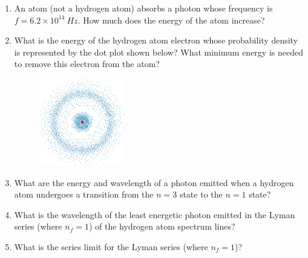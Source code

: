 \begin{enumerate}

\item An atom (not a hydrogen atom) absorbs a photon whose frequency is
$f = 6.2\times 10^{14}~Hz$.
How much does the energy of the atom increase?

\item What is the energy of the hydrogen atom  electron whose probability density
is represented by the dot plot shown below? 
What minimum energy is needed to remove this electron from the atom?
\begin{figure}[hbt]
\begin{center}
\includegraphics[height=1.5in]{solveSE/hwfig2.eps}
\end{center}
\end{figure}

\item What are the energy and wavelength of a photon emitted when a hydrogen atom
undergoes a transition from the $n=3$ state to the $n=1$ state?

\item What is the wavelength of the least energetic photon emitted in the Lyman
series (where $n_f = 1$) of the hydrogen atom spectrum lines?

\item What is the series limit for the Lyman series (where $n_f = 1$)?

\end{enumerate}
